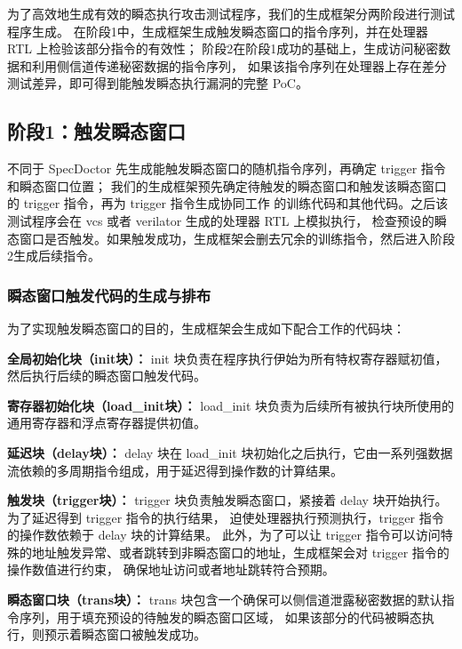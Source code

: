 为了高效地生成有效的瞬态执行攻击测试程序，我们的生成框架分两阶段进行测试程序生成。
在阶段1中，生成框架生成触发瞬态窗口的指令序列，并在处理器 RTL 上检验该部分指令的有效性；
阶段2在阶段1成功的基础上，生成访问秘密数据和利用侧信道传递秘密数据的指令序列，
如果该指令序列在处理器上存在差分测试差异，即可得到能触发瞬态执行漏洞的完整 PoC。\par

\subsection{阶段1：触发瞬态窗口}

不同于 SpecDoctor 先生成能触发瞬态窗口的随机指令序列，再确定 trigger 指令和瞬态窗口位置；
我们的生成框架预先确定待触发的瞬态窗口和触发该瞬态窗口的 trigger 指令，再为 trigger 指令生成协同工作
的训练代码和其他代码。之后该测试程序会在 vcs 或者 verilator\cite{snyder2013verilator} 生成的处理器 RTL 上模拟执行，
检查预设的瞬态窗口是否触发。如果触发成功，生成框架会删去冗余的训练指令，然后进入阶段2生成后续指令。\par

\subsubsection{瞬态窗口触发代码的生成与排布}

为了实现触发瞬态窗口的目的，生成框架会生成如下配合工作的代码块：\par

\textbf{全局初始化块（init块）：}
init 块负责在程序执行伊始为所有特权寄存器赋初值，然后执行后续的瞬态窗口触发代码。\par
\textbf{寄存器初始化块（load\_init块）：}
load\_init 块负责为后续所有被执行块所使用的通用寄存器和浮点寄存器提供初值。\par
\textbf{延迟块（delay块）：}
delay 块在 load\_init 块初始化之后执行，它由一系列强数据流依赖的多周期指令组成，用于延迟得到操作数的计算结果。\par
\textbf{触发块（trigger块）：}
trigger 块负责触发瞬态窗口，紧接着 delay 块开始执行。为了延迟得到 trigger 指令的执行结果，
迫使处理器执行预测执行，trigger 指令的操作数依赖于 delay 块的计算结果。
此外，为了可以让 trigger 指令可以访问特殊的地址触发异常、或者跳转到非瞬态窗口的地址，生成框架会对 trigger 指令的操作数值进行约束，
确保地址访问或者地址跳转符合预期。\par
\textbf{瞬态窗口块（trans块）：}
trans 块包含一个确保可以侧信道泄露秘密数据的默认指令序列，用于填充预设的待触发的瞬态窗口区域，
如果该部分的代码被瞬态执行，则预示着瞬态窗口被触发成功。\par

